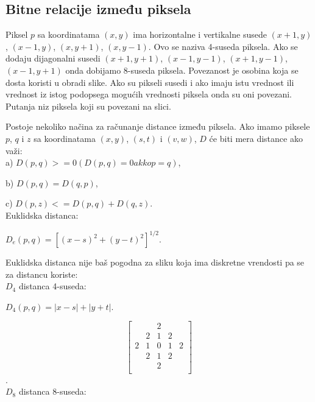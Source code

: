 \documentclass[a4paper,12pt,titlepage]{article}
\begin{document}
\subsection{Bitne relacije između piksela}%

Piksel $p$ sa koordinatama $(x, y)$ ima horizontalne i vertikalne susede $(x + 1, y)$, $(x - 1, y)$, $(x, y + 1)$, $(x, y - 1)$. Ovo se naziva 4-suseda piksela. Ako se dodaju dijagonalni susedi $(x + 1, y + 1)$, $(x - 1, y - 1)$, $(x + 1, y - 1)$, $(x - 1, y + 1)$ onda dobijamo 8-suseda piksela. Povezanost je osobina koja se dosta koristi u obradi slike. Ako su pikseli susedi i ako imaju istu vrednost ili vrednost iz istog podopsega mogućih vrednosti piksela onda su oni povezani. Putanja niz piksela koji su povezani na slici.

Postoje nekoliko načina za računanje distance između piksela. Ako imamo piksele $p$, $q$ i $z$ sa koordinatama $(x, y)$, $(s, t)$ i $(v, w)$, $D$ će biti mera distance ako važi: \\

a) $D(p, q) >= 0 (D(p, q) = 0 akko p = q)$,

b) $D(p, q) = D(q, p)$,

c) $D(p, z) <= D(p, q) + D(q, z)$.\\

Euklidska distanca: 

\begin{center}
$D_{e}(p, q) = [ (x  - s)^{2} + (y - t)^{2} ]^{1/2}.$
\end{center} 

Euklidska distanca nije baš pogodna za sliku koja ima diskretne vrendosti pa se za distancu koriste:\\

$D_{4}$ distanca 4-suseda:

\begin{center}
$D_{4}(p, q) = |x - s| + |y + t|.$
\end{center} 

\[
\begin{bmatrix}
     &  & 2 &   &  \\
     & 2 & 1 & 2  &  \\
     2 & 1 & 0 & 1 & 2 \\
     & 2 & 1 & 2  &  \\
     &  & 2 &   &  \\
\end{bmatrix}
\].\\

$D_{8}$ distanca 8-suseda:
\end{document}
